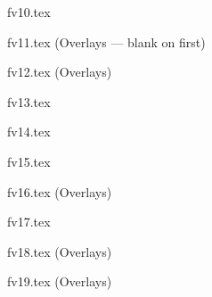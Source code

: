 \documentclass[9pt,xcolor={svgnames, x11names}]{beamer}
\def\scale{1} %
\begin{document}
\begin{frame}{fv10.tex}
	\def\scale{0.8}
	\centering
	
\end{frame}
\begin{frame}{fv11.tex (Overlays --- blank on first)}
	\def\scale{0.8}
	\centering
	
\end{frame}
\begin{frame}{fv12.tex (Overlays)}
	\def\scale{0.8}
	\centering
	
\end{frame}
\begin{frame}{fv13.tex}
	\def\scale{0.8}
	\centering
	
\end{frame}
\begin{frame}{fv14.tex}
	\def\scale{0.8}
	\centering
	
\end{frame}
\begin{frame}{fv15.tex}
	\def\scale{0.8}
	\centering
	
\end{frame}
\begin{frame}{fv16.tex (Overlays)}
	\def\scale{0.8}
	\centering
	
\end{frame}
\begin{frame}{fv17.tex }
	\def\scale{0.8}
	\centering
	
\end{frame}
\begin{frame}{fv18.tex (Overlays)}
	\def\scale{0.8}
	\centering
	
\end{frame}
\begin{frame}{fv19.tex (Overlays)}
	\def\scale{0.8}
	\centering
	
\end{frame}
\end{document}
